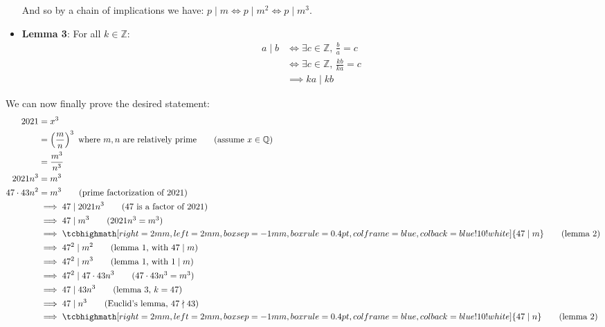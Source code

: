 \documentclass{article}
\newcommand{\Q}{\mathbb Q}
\newcommand{\Z}{\mathbb Z}
\newcommand{\divides}{\mid}
\newcommand{\ndivides}{\nmid}
\begin{document}
\begin{itemize}
  And so by a chain of implications we have: $p\divides m\iff p\divides m^2\iff p\divides m^3$.
  \item \textbf{Lemma 3}:
  For all $k\in\Z$:
  \begin{align*}
    a\divides b&\iff \exists c\in\Z,\,\frac{b}{a}=c\tag{def. of divisible}\\
    &\iff \exists c\in\Z,\,\frac{kb}{ka}=c\tag{common factor}\\
    &\implies ka\divides kb
  \end{align*}
\end{itemize}

We can now finally prove the desired statement:
\begin{align*}
  2021&=x^3\\
  &=\left(\frac{m}{n}\right)^3\text{ where $m,n$ are relatively prime}\tag{assume $x\in\Q$}\\
  &=\frac{m^3}{n^3}\\
  2021n^3&=m^3\\
  47\cdot43n^2&=m^3\tag{prime factorization of 2021}\\
  &\implies47\divides2021n^3\tag{47 is a factor of 2021}\\
  &\implies47\divides m^3\tag{$2021n^3=m^3$}\\
  &\implies\tcbhighmath[right=2mm,left=2mm,boxsep=-1mm,boxrule=0.4pt,colframe=blue,colback=blue!10!white]{47\divides m}\tag{lemma 2}\\
  &\implies47^2\divides m^2\tag{lemma 1, with $47\divides m$}\\
  &\implies47^2\divides m^3\tag{lemma 1, with $1\divides m$}\\
  &\implies47^2\divides 47\cdot43n^3\tag{$47\cdot43n^3=m^3$}\\
  &\implies47\divides 43n^3\tag{lemma 3, $k=47$}\\
  &\implies47\divides n^3\tag{Euclid's lemma, $47\ndivides43$}\\
  &\implies\tcbhighmath[right=2mm,left=2mm,boxsep=-1mm,boxrule=0.4pt,colframe=blue,colback=blue!10!white]{47\divides n}\tag{lemma 2}
\end{align*}
\end{document}
